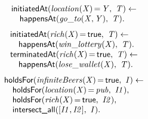 \documentclass[8pt]{beamer}
\DeclareMathOperator{\val}{=}  %
\def \patsize {}
\def\happensAt{\textsf{\patsize happensAt}}
\def\holdsFor{\textsf{\patsize holdsFor}}
\def\initiatedAt{\textsf{\patsize initiatedAt}}
\def\terminatedAt{\textsf{\patsize terminatedAt}}
\def\intersectall{\textsf{\patsize intersect\_all}}
\def\true{\textsf{\patsize true}}
\newenvironment{mysplit}%
  {\arraycolsep 0pt \begin{array}{l}}%
  {\end{array}}
\begin{document}
\begin{frame}
\begin{minipage}{0.48\linewidth}
        \begin{align*}
            \begin{mysplit}
                \initiatedAt\mathit{(location(X)\val Y,\ T) \leftarrow}\\
                \quad    \happensAt\mathit{(go\_to(X,Y),\ T).}
            \end{mysplit}
        \end{align*}
        \begin{align*}
            \begin{mysplit}
                \initiatedAt\mathit{(rich(X)\val\true,\ T) \leftarrow}\\
                \quad    \happensAt\mathit{(win\_lottery(X),\ T).}\\
                \terminatedAt\mathit{(rich(X)\val\true,\ T) \leftarrow}\\
                \quad    \happensAt\mathit{(lose\_wallet(X),\ T)}.\\
            \end{mysplit}
        \end{align*}
        \begin{align*}
            \begin{mysplit}
                \holdsFor\mathit{(infiniteBeers(X)\val\true,\ I) \leftarrow}\\
                \quad    \holdsFor\mathit{(location(X)\val pub,\ I1),}\\
                \quad    \holdsFor\mathit{(rich(X)\val\true,\ I2),}\\
                \quad    \intersectall\mathit{([I1,I2],\ I).}\\
            \end{mysplit}
        \end{align*}
    \end{minipage}

\end{frame}
\end{document}
